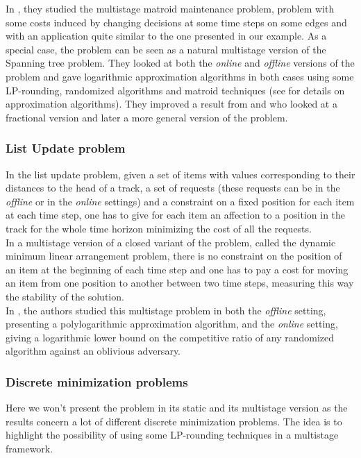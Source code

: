 \documentclass[a4paper]{book}
\begin{document}
In \cite{Gupta}, they studied the {\sc multistage matroid maintenance} problem, problem with some costs induced by changing decisions at some time steps on some edges and with an application quite similar to the one presented in our example. As a special case, the problem can be seen as a natural multistage version of the {\sc Spanning tree} problem.  They looked at both the \emph{online} and \emph{offline} versions of the problem and gave logarithmic approximation algorithms in both cases using some LP-rounding, randomized algorithms and matroid techniques (see \cite{vazirani2013approximation} for details on approximation algorithms). They improved a result from \cite{buchbinder2012unified} and \cite{buchbinder2014competitive} who looked at a fractional version and later a more general version of the problem. 





\subsubsection{List Update problem}
In the {\sc list update} problem, given a set of items with values corresponding to their distances to the head of a track, a set of requests (these requests can be in the \textit{offline} or in the \textit{online} settings) and a constraint on a fixed position for each item at each time step, one has to give for each item an affection to a position in the track for the whole time horizon minimizing the cost of all the requests. \\
In a multistage version of a closed variant of the problem, called the {\sc dynamic minimum linear arrangement} problem, there is no constraint on the position of an item at the beginning of each time step and one has to pay a cost for moving an item from one position to another between two time steps, measuring this way the stability of the solution.\\

In \cite{olver2018itinerant}, the authors studied this multistage problem in both the \emph{offline} setting, presenting a polylogarithmic approximation algorithm, and the  \emph{online} setting, giving a logarithmic lower bound on the competitive ratio of any randomized algorithm against an oblivious adversary. 

\subsubsection{Discrete minimization problems}
Here we won't present the problem in its static and its multistage version as the results concern a lot of different discrete minimization problems. The idea is to highlight the possibility of using some LP-rounding techniques in a multistage framework.\\
\end{document}
